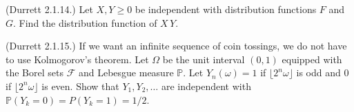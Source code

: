 \documentclass[12pt]{gradescopeexam}
\renewcommand\P{\mathbb{P}}
\renewcommand\c[1]{\mathcal{#1}}
\begin{document}
\begin{questions}
\begin{question}
  \end{question}

  \begin{question}
    (Durrett 2.1.14.)
    Let $X, Y \ge 0$
    be independent with distribution functions $F$ and
    $G$. Find the distribution function of $X\,Y$.
    \begin{solutionorbox}[6in]

    \end{solutionorbox}
  \end{question}
  
  \begin{question}
    (Durrett 2.1.15.)
    If we want an infinite sequence of coin tossings, we do not have
    to use Kolmogorov’s theorem. Let $\Omega$
    be the unit interval $(0,1)$ equipped
    with the Borel sets $\c{F}$ and Lebesgue measure $\P$.
    Let $Y_n (\omega) = 1$ if $\lfloor 2^n \omega\rfloor$
    is odd and $0$ if $\lfloor 2^n \omega\rfloor$ is even.
    Show that $Y_1 , Y_2 , \ldots$ are independent with
    $\P(Y_k = 0) = P (Y_k = 1) = 1/2$.
    \begin{prooforbox}[6in]
    \end{prooforbox}      
  \end{question}
\end{questions}
\end{document}
